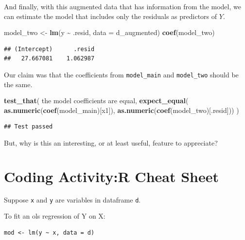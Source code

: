 \documentclass[
]{book}
\newenvironment{Shaded}{\begin{snugshade}}{\end{snugshade}}
\newcommand{\AttributeTok}[1]{\textcolor[rgb]{0.13,0.29,0.53}{#1}}
\newcommand{\FunctionTok}[1]{\textcolor[rgb]{0.13,0.29,0.53}{\textbf{#1}}}
\newcommand{\NormalTok}[1]{#1}
\newcommand{\OtherTok}[1]{\textcolor[rgb]{0.56,0.35,0.01}{#1}}
\newcommand{\SpecialCharTok}[1]{\textcolor[rgb]{0.81,0.36,0.00}{\textbf{#1}}}
\newcommand{\StringTok}[1]{\textcolor[rgb]{0.31,0.60,0.02}{#1}}
\theoremstyle{definition}
\theoremstyle{definition}
\theoremstyle{definition}
\theoremstyle{definition}
\theoremstyle{remark}
\begin{document}
And finally, with this augmented data that has information from the model, we can estimate the model that includes only the residuals as predictors of \(Y\).

\begin{Shaded}
\begin{Highlighting}[]
\NormalTok{model\_two }\OtherTok{\textless{}{-}} \FunctionTok{lm}\NormalTok{(y }\SpecialCharTok{\textasciitilde{}}\NormalTok{ .resid, }\AttributeTok{data =}\NormalTok{ d\_augmented)}
\FunctionTok{coef}\NormalTok{(model\_two)}
\end{Highlighting}
\end{Shaded}

\begin{verbatim}
## (Intercept)      .resid 
##   27.667081    1.062987
\end{verbatim}

Our claim was that the coefficients from \texttt{model\_main} and \texttt{model\_two} should be the same.

\begin{Shaded}
\begin{Highlighting}[]
\FunctionTok{test\_that}\NormalTok{(}
  \StringTok{\textquotesingle{}the model coefficients are equal\textquotesingle{}}\NormalTok{, }
  \FunctionTok{expect\_equal}\NormalTok{(}
    \FunctionTok{as.numeric}\NormalTok{(}\FunctionTok{coef}\NormalTok{(model\_main)[}\StringTok{\textquotesingle{}x1\textquotesingle{}}\NormalTok{]), }
    \FunctionTok{as.numeric}\NormalTok{(}\FunctionTok{coef}\NormalTok{(model\_two)[}\StringTok{\textquotesingle{}.resid\textquotesingle{}}\NormalTok{]))}
\NormalTok{)}
\end{Highlighting}
\end{Shaded}

\begin{verbatim}
## Test passed
\end{verbatim}

But, why is this an interesting, or at least useful, feature to appreciate?

\section{Coding Activity:R Cheat Sheet}\label{coding-activityr-cheat-sheet}

Suppose \texttt{x} and \texttt{y} are variables in dataframe \texttt{d}.

To fit an ols regression of Y on X:

\begin{verbatim}
mod <- lm(y ~ x, data = d)
\end{verbatim}
\end{document}
